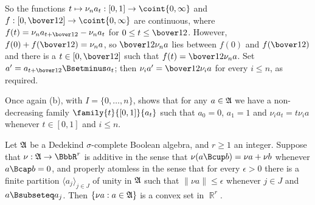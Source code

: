 {

\noindent So the functions $t\mapsto\nu_na_t:[0,1]\to\coint{0,\infty}$ and
$f:[0,\bover12]\to\coint{0,\infty}$ are continuous, where
$f(t)=\nu_na_{t+\bover12}-\nu_na_t$ for $0\le t\le\bover12$.   However,
$f(0)+f(\bover12)=\nu_na$, so $\bover12\nu_na$ lies between $f(0)$ and
$f(\bover12)$ and there is a $t\in[0,\bover12]$ such that
$f(t)=\bover12\nu_na$.   Set $a'=a_{t+\bover12}\Bsetminus a_t$;  then
$\nu_ia'=\bover12\nu_ia$ for every $i\le n$, as required.\ \Qed

Once again (b), with $I=\{0,\ldots,n\}$, shows that for any $a\in\frak A$
we have a non-decreasing family $\family{t}{[0,1]}{a_t}$ such that
$a_0=0$, $a_1=1$ and $\nu_ia_t=t\nu_ia$ whenever $t\in[0,1]$ and $i\le n$.
}%

Let $\frak A$ be a Dedekind $\sigma$-complete Boolean
algebra, and $r\ge 1$ an integer.   Suppose that $\nu:\frak A\to\BbbR^r$
is additive in the sense that $\nu(a\Bcup b)=\nu a+\nu b$ whenever
$a\Bcap b=0$, and
properly atomless in the sense that for every $\epsilon>0$ there is a
finite partition $\langle a_j\rangle_{j\in J}$ of unity in $\frak A$ such
that $\|\nu a\|\le\epsilon$ whenever $j\in J$ and $a\Bsubseteq a_j$.
Then $\{\nu a:a\in\frak A\}$ is a convex set in
$\BbbR^r$.

